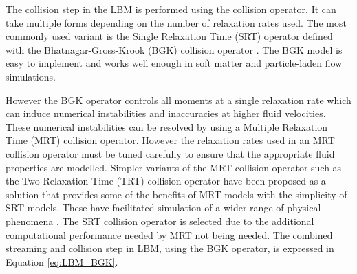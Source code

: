 

The collision step in the LBM is performed using the collision operator. It can take multiple forms depending on the number of
relaxation rates used. The most commonly used variant is the Single Relaxation Time (SRT) operator defined with the Bhatnagar-Gross-Krook (BGK) 
collision operator \cite{bhatnagar_model_1954, qian_lattice_1992}. The BGK model is easy to implement and works well enough in soft matter and
particle-laden flow simulations.

However the BGK operator controls all moments at a single relaxation rate which can induce numerical instabilities and inaccuracies
at higher fluid velocities. \cite{liu_simulation_2023, adhikari_fluctuating_2005} These numerical instabilities can be resolved by using
a Multiple Relaxation Time (MRT) collision operator. However the relaxation rates used in an MRT collision operator must be tuned carefully
to ensure that the appropriate fluid properties are modelled. Simpler variants of the MRT collision operator such as the Two Relaxation Time (TRT)
collision operator have been proposed as a solution that provides some of the benefits of MRT models with the simplicity of SRT models. These 
have facilitated simulation of a wider range of physical phenomena \cite{adhikari_fluctuating_2005, liu_simulation_2023}. The SRT collision 
operator is selected due to the additional computational performance needed by MRT not being needed. The combined streaming and 
collision step in LBM, using the BGK operator, is expressed in Equation \ref{eq:LBM_BGK}.

